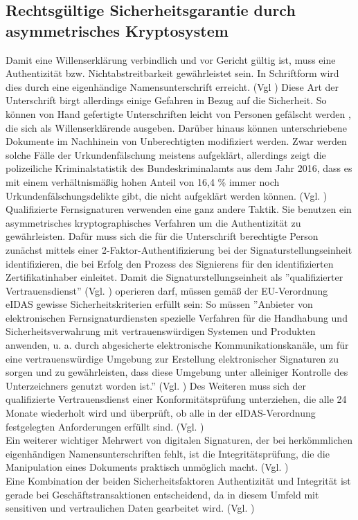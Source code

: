 \documentclass[deutsch]{lib/llncs/llncs}
\begin{document}
\subsection{Rechtsgültige Sicherheitsgarantie durch asymmetrisches Kryptosystem}
Damit eine Willenserklärung verbindlich und vor Gericht gültig ist, muss eine Authentizität bzw. Nichtabstreitbarkeit gewährleistet sein. In Schriftform wird dies durch eine eigenhändige Namensunterschrift erreicht. (Vgl \cite[S. 5-6]{Zitat07}) Diese Art der Unterschrift birgt allerdings einige Gefahren in Bezug auf die Sicherheit. So können von Hand gefertigte Unterschriften leicht von Personen gefälscht werden , die sich als Willenserklärende ausgeben. Darüber hinaus können unterschriebene Dokumente im Nachhinein von Unberechtigten modifiziert werden. Zwar werden solche Fälle der Urkundenfälschung meistens aufgeklärt, allerdings zeigt die polizeiliche Kriminalstatistik des Bundeskriminalamts aus dem Jahr 2016, dass es mit einem verhältnismäßig hohen Anteil von 16,4 \% immer noch Urkundenfälschungsdelikte gibt, die nicht aufgeklärt werden können. (Vgl. \cite[S. 34]{Zitat10})\\
Qualifizierte Fernsignaturen verwenden eine ganz andere Taktik. Sie benutzen ein asymmetrisches kryptographisches Verfahren um die Authentizität zu gewährleisten. Dafür muss sich die für die Unterschrift berechtigte Person zunächst mittels einer 2-Faktor-Authentifizierung bei der Signaturstellungseinheit identifizieren, die bei Erfolg den Prozess des Signierens für den identifizierten Zertifikatinhaber einleitet. Damit die Signaturstellungseinheit als ''qualifizierter Vertrauensdienst'' (Vgl. \cite[S. 30]{Zitat08}) operieren darf, müssen gemäß der EU-Verordnung eIDAS gewisse Sicherheitskriterien erfüllt sein: So müssen ''Anbieter von elektronischen Fernsignaturdiensten spezielle Verfahren für die Handhabung und Sicherheitsverwahrung mit vertrauenswürdigen Systemen und Produkten anwenden, u. a. durch abgesicherte elektronische Kommunikationskanäle, um für eine vertrauenswürdige Umgebung zur Erstellung elektronischer Signaturen zu sorgen und zu gewährleisten, dass diese Umgebung unter alleiniger Kontrolle des Unterzeichners genutzt worden ist.'' (Vgl. \cite[S. 233]{Zitat09}) Des Weiteren muss sich der qualifizierte Vertrauensdienst einer Konformitätsprüfung unterziehen, die alle 24 Monate wiederholt wird und überprüft, ob alle in der eIDAS-Verordnung festgelegten Anforderungen erfüllt sind. (Vgl. \cite[S. 30]{Zitat08}) \\
Ein weiterer wichtiger Mehrwert von digitalen Signaturen, der bei herkömmlichen eigenhändigen Namensunterschriften fehlt, ist die Integritätsprüfung, die die Manipulation eines Dokuments praktisch unmöglich macht. (Vgl. \cite[S. 7]{Zitat05}) \\
Eine Kombination der beiden Sicherheitsfaktoren Authentizität und Integrität ist gerade bei Geschäftstransaktionen entscheidend, da in diesem Umfeld mit sensitiven und vertraulichen Daten gearbeitet wird. (Vgl. \cite[S. 7]{Zitat05})
\end{document}
